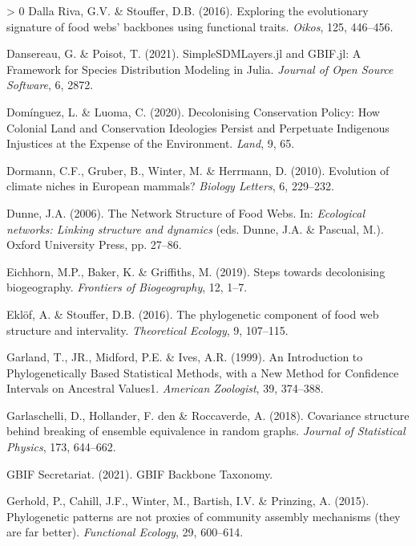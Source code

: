 \documentclass[10pt,oneside]{article}
\newlength{\cslhangindent}
\newenvironment{CSLReferences}[3] %
 {%
  \setlength{\parindent}{0pt}
  \ifodd #1 \everypar{\setlength{\hangindent}{\cslhangindent}}\ignorespaces\fi
  \ifnum #2 > 0
  \setlength{\parskip}{#2\baselineskip}
  \fi
 }%
 {}
\begin{document}
\begin{CSLReferences}{1}{0}
\leavevmode\hypertarget{ref-DallaRiva2016ExpEvo}{}%
Dalla Riva, G.V. \& Stouffer, D.B. (2016). Exploring the evolutionary
signature of food webs' backbones using functional traits. \emph{Oikos},
125, 446--456.

\leavevmode\hypertarget{ref-Dansereau2021SimJl}{}%
Dansereau, G. \& Poisot, T. (2021). SimpleSDMLayers.jl and GBIF.jl: A
Framework for Species Distribution Modeling in Julia. \emph{Journal of
Open Source Software}, 6, 2872.

\leavevmode\hypertarget{ref-Dominguez2020DecCon}{}%
Domínguez, L. \& Luoma, C. (2020). Decolonising Conservation Policy: How
Colonial Land and Conservation Ideologies Persist and Perpetuate
Indigenous Injustices at the Expense of the Environment. \emph{Land}, 9,
65.

\leavevmode\hypertarget{ref-Dormann2010EvoCli}{}%
Dormann, C.F., Gruber, B., Winter, M. \& Herrmann, D. (2010). Evolution
of climate niches in European mammals? \emph{Biology Letters}, 6,
229--232.

\leavevmode\hypertarget{ref-Dunne2006NetStr}{}%
Dunne, J.A. (2006). The Network Structure of Food Webs. In:
\emph{Ecological networks: Linking structure and dynamics} (eds. Dunne,
J.A. \& Pascual, M.). Oxford University Press, pp. 27--86.

\leavevmode\hypertarget{ref-Eichhorn2019SteDec}{}%
Eichhorn, M.P., Baker, K. \& Griffiths, M. (2019). Steps towards
decolonising biogeography. \emph{Frontiers of Biogeography}, 12, 1--7.

\leavevmode\hypertarget{ref-Eklof2016PhyCom}{}%
Eklöf, A. \& Stouffer, D.B. (2016). The phylogenetic component of food
web structure and intervality. \emph{Theoretical Ecology}, 9, 107--115.

\leavevmode\hypertarget{ref-Garland1999IntPhy}{}%
Garland, T., JR., Midford, P.E. \& Ives, A.R. (1999). An Introduction to
Phylogenetically Based Statistical Methods, with a New Method for
Confidence Intervals on Ancestral Values1. \emph{American Zoologist},
39, 374--388.

\leavevmode\hypertarget{ref-Garlaschelli2018CovStr}{}%
Garlaschelli, D., Hollander, F. den \& Roccaverde, A. (2018). Covariance
structure behind breaking of ensemble equivalence in random graphs.
\emph{Journal of Statistical Physics}, 173, 644--662.

\leavevmode\hypertarget{ref-GBIFSecretariat2021GbiBac}{}%
GBIF Secretariat. (2021). GBIF Backbone Taxonomy.

\leavevmode\hypertarget{ref-Gerhold2015PhyPat}{}%
Gerhold, P., Cahill, J.F., Winter, M., Bartish, I.V. \& Prinzing, A.
(2015). Phylogenetic patterns are not proxies of community assembly
mechanisms (they are far better). \emph{Functional Ecology}, 29,
600--614.


\end{CSLReferences}
\end{document}
